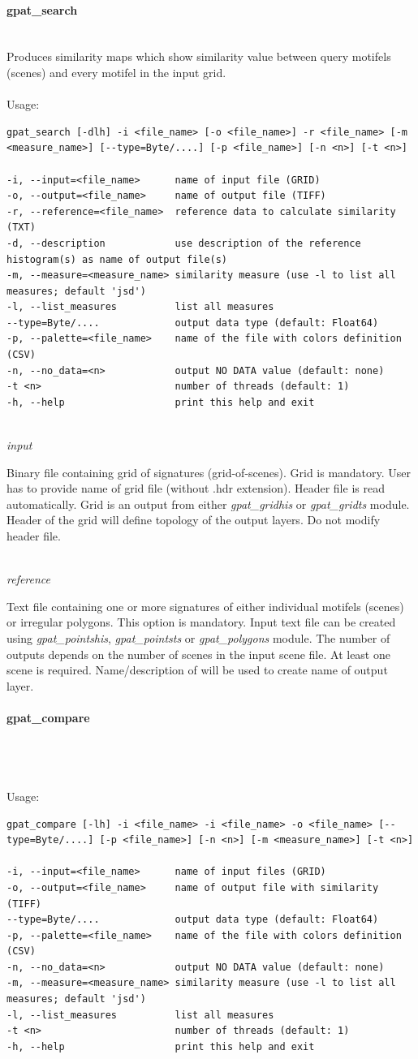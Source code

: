 \documentclass[12pt,margin=0.5in]{article}
\newcommand{\newparagraph}[1]{\paragraph{#1}\mbox{}\\}
\newcommand{\newoption}[1]{\mbox{}\\{\it #1}}
\begin{document}
\newparagraph{gpat\_search}
Produces similarity maps which show similarity value between query motifels (scenes) and every motifel in the input grid.
\\\\
Usage:
\begin{lstlisting}[frame=single]
gpat_search [-dlh] -i <file_name> [-o <file_name>] -r <file_name> [-m <measure_name>] [--type=Byte/....] [-p <file_name>] [-n <n>] [-t <n>]

-i, --input=<file_name>      name of input file (GRID)
-o, --output=<file_name>     name of output file (TIFF)
-r, --reference=<file_name>  reference data to calculate similarity (TXT)
-d, --description            use description of the reference histogram(s) as name of output file(s)
-m, --measure=<measure_name> similarity measure (use -l to list all measures; default 'jsd')
-l, --list_measures          list all measures
--type=Byte/....             output data type (default: Float64)
-p, --palette=<file_name>    name of the file with colors definition (CSV)
-n, --no_data=<n>            output NO DATA value (default: none)
-t <n>                       number of threads (default: 1)
-h, --help                   print this help and exit
\end{lstlisting}

\newoption{input}

Binary file containing grid of signatures (grid-of-scenes). Grid is mandatory. User has to provide name of grid file (without .hdr extension). Header file is read automatically. Grid is an output from either {\it gpat\_gridhis} or {\it gpat\_gridts} module. Header of the grid will define topology of the output layers. Do not modify header file.

\newoption{reference}

Text file containing one or more signatures of either individual motifels (scenes) or irregular polygons. This option is mandatory. Input text file can be created using {\it gpat\_pointshis}, {\it gpat\_pointsts} or {\it gpat\_polygons} module. The number of outputs depends on the number of scenes in the input scene file. At least one scene is required. Name/description of  will be used to create name of output layer. 

\newparagraph{gpat\_compare}
{}
\\\\
Usage:
\begin{lstlisting}[frame=single]
gpat_compare [-lh] -i <file_name> -i <file_name> -o <file_name> [--type=Byte/....] [-p <file_name>] [-n <n>] [-m <measure_name>] [-t <n>]

-i, --input=<file_name>      name of input files (GRID)
-o, --output=<file_name>     name of output file with similarity (TIFF)
--type=Byte/....             output data type (default: Float64)
-p, --palette=<file_name>    name of the file with colors definition (CSV)
-n, --no_data=<n>            output NO DATA value (default: none)
-m, --measure=<measure_name> similarity measure (use -l to list all measures; default 'jsd')
-l, --list_measures          list all measures
-t <n>                       number of threads (default: 1)
-h, --help                   print this help and exit
\end{lstlisting}
\end{document}
